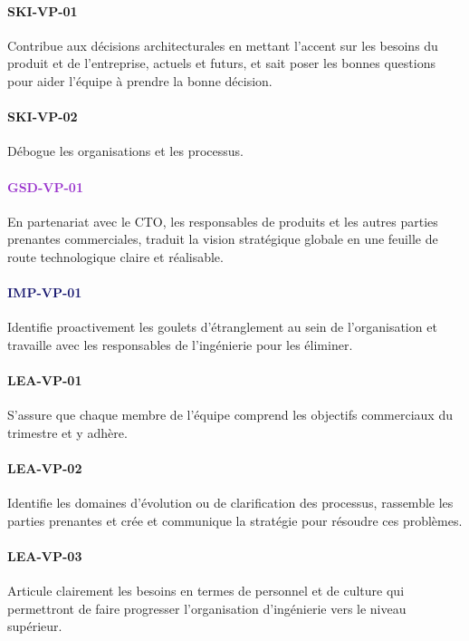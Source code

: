 \documentclass[a4paper, french, openany, 12pt]{book}
\newcommand\dex[1]{\textcolor{BrickRed}{\textbf{\uppercase{ski-{#1}}}}}
\newcommand\str[1]{\textcolor{DarkOrchid}{\textbf{\uppercase{gsd-{#1}}}}}
\newcommand\wis[1]{\textcolor{MidnightBlue}{\textbf{\uppercase{imp-{#1}}}}}
\newcommand\cha[1]{\textcolor{OliveGreen}{\textbf{\uppercase{lea-{#1}}}}}
\begin{document}
\begin{multicols}{2}

  \paragraph*{\dex{vp-01}}
  
  Contribue aux décisions architecturales en mettant l'accent sur les besoins du produit et de l'entreprise,
  actuels et futurs, et sait poser les bonnes questions pour aider l'équipe à prendre la bonne décision.
  
  \paragraph*{\dex{vp-02}}

  Débogue les organisations et les processus.

  \paragraph*{\str{vp-01}}

  En partenariat avec le CTO, les responsables de produits et les autres parties prenantes commerciales, 
  traduit la vision stratégique globale en une feuille de route technologique claire et réalisable.

  \paragraph*{\wis{vp-01}}

  Identifie proactivement les goulets d'étranglement au sein de l'organisation et travaille avec les
  responsables de l'ingénierie pour les éliminer.

  \paragraph*{\cha{vp-01}}

  S'assure que chaque membre de l'équipe comprend les objectifs commerciaux du trimestre et y adhère.
  
  \paragraph*{\cha{vp-02}}

  Identifie les domaines d'évolution ou de clarification des processus, rassemble les parties prenantes et crée et 
  communique la stratégie pour résoudre ces problèmes.
  
  \paragraph*{\cha{vp-03}}

  Articule clairement les besoins en termes de personnel et de culture qui permettront de faire progresser l'organisation
  d'ingénierie vers le niveau supérieur.

\end{multicols}
\end{document}
